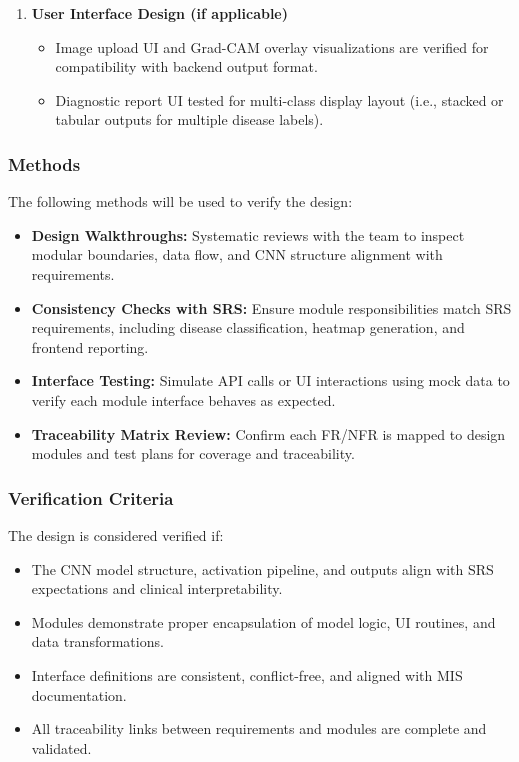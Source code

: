 \documentclass[12pt, titlepage]{article}
\begin{document}
\begin{enumerate}
\begin{itemize}
      \item UI modules depend on Backend API, which depends on ML model, which in turn depends on DataLoader and Preprocessing modules (clean downward hierarchy).
    \end{itemize}
  \item \textbf{User Interface Design (if applicable)}
    \begin{itemize}
      \item Image upload UI and Grad-CAM overlay visualizations are verified for compatibility with backend output format.
      \item Diagnostic report UI tested for multi-class display layout (i.e., stacked or tabular outputs for multiple disease labels).
    \end{itemize}
\end{enumerate}

\subsubsection{Methods}
The following methods will be used to verify the design:
\begin{itemize}
  \item \textbf{Design Walkthroughs:} Systematic reviews with the team to inspect modular boundaries, data flow, and CNN structure alignment with requirements.
  \item \textbf{Consistency Checks with SRS:} Ensure module responsibilities match SRS requirements, including disease classification, heatmap generation, and frontend reporting.
  \item \textbf{Interface Testing:} Simulate API calls or UI interactions using mock data to verify each module interface behaves as expected.
  \item \textbf{Traceability Matrix Review:} Confirm each FR/NFR is mapped to design modules and test plans for coverage and traceability.
\end{itemize}

\subsubsection{Verification Criteria}
The design is considered verified if:
\begin{itemize}
  \item The CNN model structure, activation pipeline, and outputs align with SRS expectations and clinical interpretability.
  \item Modules demonstrate proper encapsulation of model logic, UI routines, and data transformations.
  \item Interface definitions are consistent, conflict-free, and aligned with MIS documentation.
  \item All traceability links between requirements and modules are complete and validated.
\end{itemize}
\end{document}
